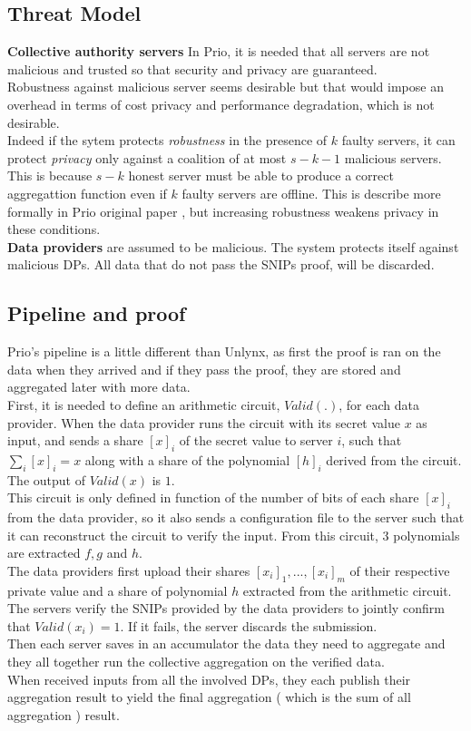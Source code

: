 \documentclass{article}
\begin{document}
\subsection{Threat Model}
\textbf{Collective authority servers} In Prio, it is needed that all servers are not malicious and trusted so that security and privacy are guaranteed.\\
Robustness against malicious server seems desirable but that would impose an overhead in terms of cost privacy and performance degradation, which is not desirable.\\
Indeed if the sytem protects \textit{robustness} in the presence of $k$ faulty servers, it can protect \textit{privacy} only against a coalition of at most $s-k-1$ malicious servers. This is because $s-k$ honest server must be able to produce a correct aggregattion function even if $k$ faulty servers are offline. This is describe more formally in Prio original paper \cite{prio}, but increasing robustness weakens privacy in these conditions.\\
\textbf{Data providers} are assumed to be malicious. The system protects itself against malicious DPs. All data that do not pass the SNIPs proof, will be discarded.\\

\subsection{Pipeline and proof}
Prio's pipeline is a little different than Unlynx, as first the proof is ran on the data when they arrived and if they pass the proof, they are stored and aggregated later with more data.\\
First, it is needed to define an arithmetic circuit, $Valid(.)$, for each data provider.
When the data provider runs the circuit with its secret value $x$ as input, and sends a share $[x]_i$ of the secret value to server $i$, such that $\sum_{i}{[x]_i} = x $ along with a share of the polynomial $[h]_i$ derived from the circuit. The output of $Valid(x)$ is $1$.\\ 
This circuit is only defined in function of the number of bits of each share $[x]_i$ from the data provider, so it also sends a configuration file to the server such that it can reconstruct the circuit to verify the input. From this circuit, $3$ polynomials are extracted $f,g $ and $h$.\\

The data providers first upload their shares $[x_i]_1,...,[x_i]_m$ of their respective private value and a share of polynomial $h$ extracted from the arithmetic circuit.\\
The servers verify the SNIPs provided by the data providers to jointly confirm that $Valid(x_i) = 1$. If it fails, the server discards the submission.\\
Then each server saves in an accumulator the data they need to aggregate and they all together run the collective aggregation on the verified data.\\
When received inputs from all the involved DPs, they each publish their aggregation result to yield the final aggregation ( which is the sum of all aggregation ) result.
\end{document}
